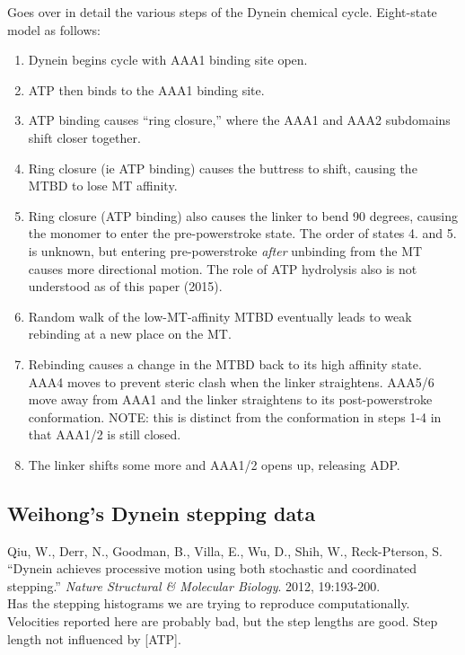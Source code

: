 \documentclass[10pt]{article} %
\begin{document}
Goes over in detail the various steps of the Dynein chemical cycle. Eight-state model as follows:\\

\begin{enumerate}
\item Dynein begins cycle with AAA1 binding site open.
\item ATP then binds to the AAA1 binding site.
\item ATP binding causes ``ring closure,'' where the AAA1 and AAA2 subdomains shift closer together.
\item Ring closure (ie ATP binding) causes the buttress to shift, causing the MTBD to lose MT affinity.
\item Ring closure (ATP binding) also causes the linker to bend 90 degrees, causing the monomer to enter the pre-powerstroke state. The order of states 4. and 5. is unknown, but entering pre-powerstroke \textit{after} unbinding from the MT causes more directional motion. The role of ATP hydrolysis also is not understood as of this paper (2015).
\item Random walk of the low-MT-affinity MTBD eventually leads to weak rebinding at a new place on the MT.
\item Rebinding causes a change in the MTBD back to its high affinity state. AAA4 moves to prevent steric clash when the linker straightens. AAA5/6 move away from AAA1 and the linker straightens to its post-powerstroke conformation. NOTE: this is distinct from the conformation in steps 1-4 in that AAA1/2 is still closed.
\item The linker shifts some more and AAA1/2 opens up, releasing ADP.
\end{enumerate}

\subsection{Weihong's Dynein stepping data}
Qiu, W., Derr, N., Goodman, B., Villa, E., Wu, D., Shih, W., Reck-Pterson, S. ``Dynein achieves processive motion using both stochastic and coordinated stepping.'' \textit{Nature Structural \& Molecular Biology}. 2012, 19:193-200.\\

Has the stepping histograms we are trying to reproduce computationally.\\

Velocities reported here are probably bad, but the step lengths are good. Step length not influenced by [ATP].\\
\end{document}
